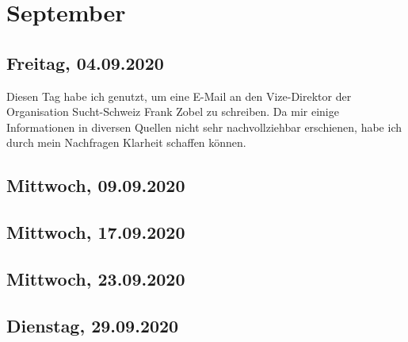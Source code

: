 \documentclass[../main.tex]{subfiles}
\begin{document}
	\section{September}
	
	\subsection{Freitag, 04.09.2020}
	Diesen Tag habe ich genutzt, um eine E-Mail an den Vize-Direktor der Organisation Sucht-Schweiz Frank Zobel zu schreiben.
	Da mir einige Informationen in diversen Quellen nicht sehr nachvollziehbar erschienen, habe ich durch mein Nachfragen Klarheit schaffen können.
	
	
	
	\subsection{Mittwoch, 09.09.2020}
	
	\subsection{Mittwoch, 17.09.2020}
	
	\subsection{Mittwoch, 23.09.2020}
	
	\subsection{Dienstag, 29.09.2020}
\end{document}
